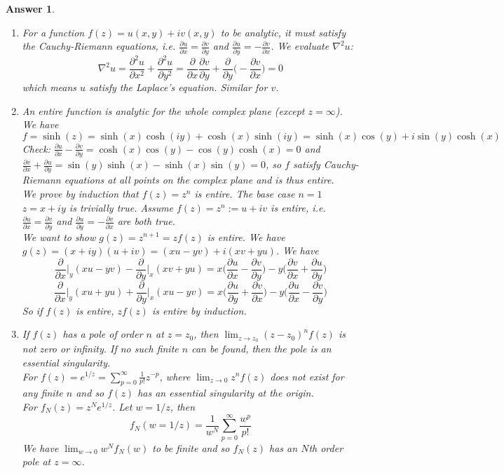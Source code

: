 \documentclass[a4paper]{article}
\newtheorem{ans}{Answer}[section]
\theoremstyle{new}
\begin{document}
\begin{ans}\leavevmode
\begin{enumerate}[label=(\alph*)]
\item For a function $f(z)=u(x,y)+iv(x,y)$ to be analytic, it must satisfy the Cauchy-Riemann equations, i.e. $\frac{\partial u}{\partial x}=\frac{\partial v}{\partial y}$ and $\frac{\partial u}{\partial y}=-\frac{\partial v}{\partial x}$. We evaluate $\nabla^2u$:
$$\nabla^2u=\frac{\partial^2u}{\partial x^2}+\frac{\partial^2u}{\partial y^2}=\frac{\partial}{\partial x}\frac{\partial v}{\partial y}+\frac{\partial}{\partial y}\bigg(-\frac{\partial v}{\partial x}\bigg)=0$$
which means $u$ satisfy the Laplace's equation. Similar for $v$.
\item An entire function is analytic for the whole complex plane (except $z=\infty$). We have
$$f=\sinh(z)=\sinh(x)\cosh(iy)+\cosh(x)\sinh(iy)=\sinh(x)\cos(y)+i\sin(y)\cosh(x)$$
Check: $\frac{\partial u}{\partial x}-\frac{\partial v}{\partial y}=\cosh(x)\cos(y)-\cos(y)\cosh(x)=0$ and $\frac{\partial v}{\partial x}+\frac{\partial u}{\partial y}=\sin(y)\sinh(x)-\sinh(x)\sin(y)=0$, so $f$ satisfy Cauchy-Riemann equations at all points on the complex plane and is thus entire.\\[5pt]
We prove by induction that $f(z)=z^n$ is entire. The base case $n=1$ $z=x+iy$ is trivially true. Assume $f(z)=z^n:=u+iv$ is entire, i.e. $\frac{\partial u}{\partial x}=\frac{\partial v}{\partial y}$ and $\frac{\partial u}{\partial y}=-\frac{\partial v}{\partial x}$ are both true.\\[5pt]
We want to show $g(z)=z^{n+1}=zf(z)$ is entire. We have $g(z)=(x+iy)(u+iv)=(xu-yv)+i(xv+yu)$. We have
$$\frac{\partial}{\partial x}\bigg|_y(xu-yv)-\frac{\partial}{\partial y}\bigg|_x(xv+yu)=x\bigg(\frac{\partial u}{\partial x}-\frac{\partial v}{\partial y}\bigg)-y\bigg(\frac{\partial v}{\partial x}+\frac{\partial u}{\partial y}\bigg)$$
$$\frac{\partial}{\partial x}\bigg|_y(xu+yu)+\frac{\partial}{\partial y}\bigg|_x(xu-yv)=x\bigg(\frac{\partial u}{\partial y}+\frac{\partial v}{\partial x}\bigg)-y\bigg(\frac{\partial u}{\partial x}-\frac{\partial v}{\partial y}\bigg)$$
So if $f(z)$ is entire, $zf(z)$ is entire by induction.
\item If $f(z)$ has a pole of order $n$ at $z=z_0$, then $\lim_{z\rightarrow z_0}(z-z_0)^nf(z)$ is not zero or infinity. If no such finite $n$ can be found, then the pole is an essential singularity.\\[5pt]
For $f(z)=e^{1/z}=\sum_{p=0}^\infty\frac{1}{p!}z^{-p}$, where $\lim_{z\rightarrow0}z^nf(z)$ does not exist for any finite $n$ and so $f(z)$ has an essential singularity at the origin.\\[5pt]
For $f_N(z)=z^Ne^{1/z}$. Let $w=1/z$, then
$$f_N(w=1/z)=\frac{1}{w^N}\sum_{p=0}^\infty\frac{w^p}{p!}$$
We have $\lim_{w\rightarrow0}w^Nf_N(w)$ to be finite and so $f_N(z)$ has an $N$th order pole at $z=\infty$.
\end{enumerate}
\end{ans}
\end{document}
